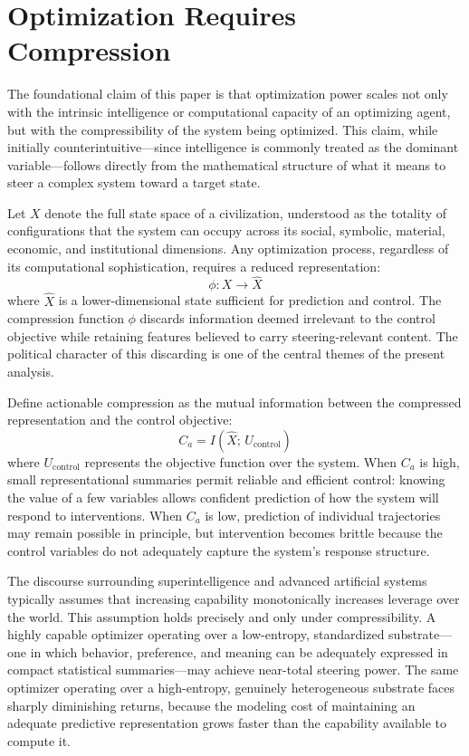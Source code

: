 \documentclass[12pt]{article}
\begin{document}
\section{Optimization Requires Compression}

The foundational claim of this paper is that optimization power scales not only with the intrinsic intelligence or computational capacity of an optimizing agent, but with the compressibility of the system being optimized. This claim, while initially counterintuitive---since intelligence is commonly treated as the dominant variable---follows directly from the mathematical structure of what it means to steer a complex system toward a target state.

Let $X$ denote the full state space of a civilization, understood as the totality of configurations that the system can occupy across its social, symbolic, material, economic, and institutional dimensions. Any optimization process, regardless of its computational sophistication, requires a reduced representation:
\[
\phi : X \rightarrow \hat{X}
\]
where $\hat{X}$ is a lower-dimensional state sufficient for prediction and control. The compression function $\phi$ discards information deemed irrelevant to the control objective while retaining features believed to carry steering-relevant content. The political character of this discarding is one of the central themes of the present analysis.

Define actionable compression as the mutual information between the compressed representation and the control objective:
\[
C_a = I(\hat{X};\, U_{\text{control}})
\]
where $U_{\text{control}}$ represents the objective function over the system. When $C_a$ is high, small representational summaries permit reliable and efficient control: knowing the value of a few variables allows confident prediction of how the system will respond to interventions. When $C_a$ is low, prediction of individual trajectories may remain possible in principle, but intervention becomes brittle because the control variables do not adequately capture the system's response structure.

The discourse surrounding superintelligence and advanced artificial systems typically assumes that increasing capability monotonically increases leverage over the world. This assumption holds precisely and only under compressibility. A highly capable optimizer operating over a low-entropy, standardized substrate---one in which behavior, preference, and meaning can be adequately expressed in compact statistical summaries---may achieve near-total steering power. The same optimizer operating over a high-entropy, genuinely heterogeneous substrate faces sharply diminishing returns, because the modeling cost of maintaining an adequate predictive representation grows faster than the capability available to compute it.
\end{document}
